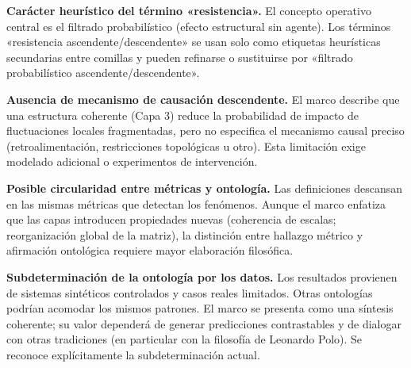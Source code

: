 \textbf{Carácter heurístico del término «resistencia».} El concepto operativo central es el filtrado probabilístico (efecto estructural sin agente). Los términos «resistencia ascendente/descendente» se usan solo como etiquetas heurísticas secundarias entre comillas y pueden refinarse o sustituirse por «filtrado probabilístico ascendente/descendente».

\textbf{Ausencia de mecanismo de causación descendente.} El marco describe que una estructura coherente (Capa 3) reduce la probabilidad de impacto de fluctuaciones locales fragmentadas, pero no especifica el mecanismo causal preciso (retroalimentación, restricciones topológicas u otro). Esta limitación exige modelado adicional o experimentos de intervención.

\textbf{Posible circularidad entre métricas y ontología.} Las definiciones descansan en las mismas métricas que detectan los fenómenos. Aunque el marco enfatiza que las capas introducen propiedades nuevas (coherencia de escalas; reorganización global de la matriz), la distinción entre hallazgo métrico y afirmación ontológica requiere mayor elaboración filosófica.

\textbf{Subdeterminación de la ontología por los datos.} Los resultados provienen de sistemas sintéticos controlados y casos reales limitados. Otras ontologías podrían acomodar los mismos patrones. El marco se presenta como una síntesis coherente; su valor dependerá de generar predicciones contrastables y de dialogar con otras tradiciones (en particular con la filosofía de Leonardo Polo). Se reconoce explícitamente la subdeterminación actual.